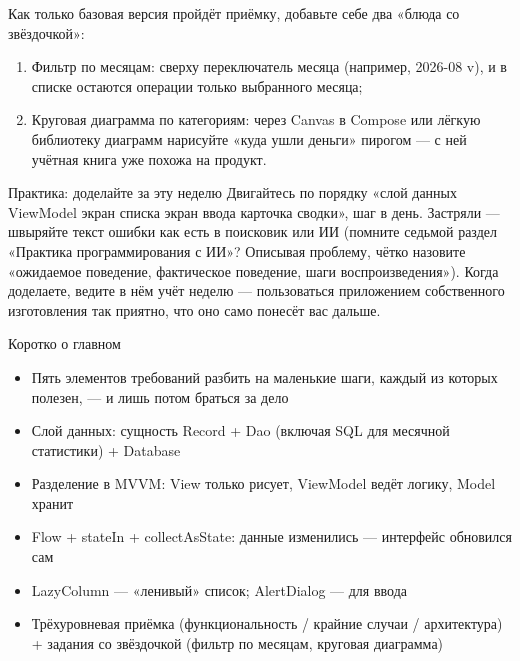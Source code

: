 Как только базовая версия пройдёт приёмку, добавьте себе два «блюда со звёздочкой»:

\begin{enumerate}
  \item Фильтр по месяцам: сверху переключатель месяца (например, 2026-08 v), и в списке остаются операции только выбранного месяца;
  \item Круговая диаграмма по категориям: через Canvas в Compose или лёгкую библиотеку диаграмм нарисуйте «куда ушли деньги» пирогом — с ней учётная книга уже похожа на продукт.
\end{enumerate}

\begin{tcbpractice}{Практика: доделайте за эту неделю}
Двигайтесь по порядку «слой данных ViewModel экран списка экран ввода карточка сводки», шаг в день. Застряли — швыряйте текст ошибки как есть в поисковик или ИИ (помните седьмой раздел «Практика программирования с ИИ»? Описывая проблему, чётко назовите «ожидаемое поведение, фактическое поведение, шаги воспроизведения»). Когда доделаете, ведите в нём учёт неделю — пользоваться приложением собственного изготовления так приятно, что оно само понесёт вас дальше.

\end{tcbpractice}

\begin{tcbsummary}{Коротко о главном}
\begin{itemize}
  \item Пять элементов требований разбить на маленькие шаги, каждый из которых полезен, — и лишь потом браться за дело
  \item Слой данных: сущность Record + Dao (включая SQL для месячной статистики) + Database
  \item Разделение в MVVM: View только рисует, ViewModel ведёт логику, Model хранит
  \item Flow + stateIn + collectAsState: данные изменились — интерфейс обновился сам
  \item LazyColumn — «ленивый» список; AlertDialog — для ввода
  \item Трёхуровневая приёмка (функциональность / крайние случаи / архитектура) + задания со звёздочкой (фильтр по месяцам, круговая диаграмма)
\end{itemize}

\end{tcbsummary}
